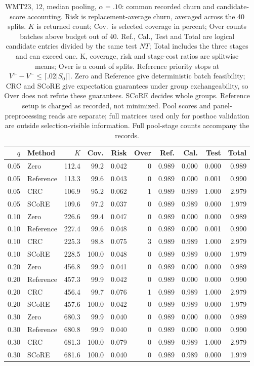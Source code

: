 \begin{table}[t]
\centering\small
\setlength{\tabcolsep}{4pt}
\begin{tabular}{rlrrrrrrrr}
\toprule
$q$ & Method & $K$ & Cov. & Risk & Over & Ref. & Cal. & Test & Total \\
\midrule
0.05 & Zero & 112.4 & 99.2 & 0.042 & 0 & 0.989 & 0.000 & 0.000 & 0.989 \\
0.05 & Reference & 113.3 & 99.6 & 0.043 & 0 & 0.989 & 0.000 & 0.001 & 0.990 \\
0.05 & CRC & 106.9 & 95.2 & 0.062 & 1 & 0.989 & 0.989 & 1.000 & 2.979 \\
0.05 & SCoRE & 109.6 & 97.2 & 0.037 & 0 & 0.989 & 0.989 & 0.000 & 1.979 \\
0.10 & Zero & 226.6 & 99.4 & 0.047 & 0 & 0.989 & 0.000 & 0.000 & 0.989 \\
0.10 & Reference & 227.4 & 99.6 & 0.048 & 0 & 0.989 & 0.000 & 0.001 & 0.990 \\
0.10 & CRC & 225.3 & 98.8 & 0.075 & 3 & 0.989 & 0.989 & 1.000 & 2.979 \\
0.10 & SCoRE & 228.5 & 100.0 & 0.048 & 0 & 0.989 & 0.989 & 0.000 & 1.979 \\
0.20 & Zero & 456.8 & 99.9 & 0.041 & 0 & 0.989 & 0.000 & 0.000 & 0.989 \\
0.20 & Reference & 457.3 & 99.9 & 0.042 & 0 & 0.989 & 0.000 & 0.000 & 0.990 \\
0.20 & CRC & 456.4 & 99.7 & 0.076 & 1 & 0.989 & 0.989 & 1.000 & 2.979 \\
0.20 & SCoRE & 457.6 & 100.0 & 0.042 & 0 & 0.989 & 0.989 & 0.000 & 1.979 \\
0.30 & Zero & 680.3 & 99.9 & 0.040 & 0 & 0.989 & 0.000 & 0.000 & 0.989 \\
0.30 & Reference & 680.8 & 99.9 & 0.040 & 0 & 0.989 & 0.000 & 0.000 & 0.990 \\
0.30 & CRC & 681.3 & 100.0 & 0.079 & 0 & 0.989 & 0.989 & 1.000 & 2.979 \\
0.30 & SCoRE & 681.6 & 100.0 & 0.040 & 0 & 0.989 & 0.989 & 0.000 & 1.979 \\
\bottomrule
\end{tabular}
\caption{WMT23, 12, median pooling, $\alpha=.10$: common recorded churn and candidate-score accounting. Risk is replacement-average churn, averaged across the 40 splits. $K$ is returned count; Cov.\ is selected coverage in percent; Over counts batches above budget out of 40. Ref., Cal., Test and Total are logical candidate entries divided by the same test $NT$; Total includes the three stages and can exceed one. K, coverage, risk and stage-cost ratios are splitwise means; Over is a count of splits. Reference priority stops at $V^+-V^-\le\lceil.02|S_0|\rceil$. Zero and Reference give deterministic batch feasibility; CRC and SCoRE give expectation guarantees under group exchangeability, so Over does not refute these guarantees. SCoRE decides whole groups. Reference setup is charged as recorded, not minimized. Pool scores and panel-preprocessing reads are separate; full matrices used only for posthoc validation are outside selection-visible information. Full pool-stage counts accompany the records.}
\label{tab:common-WMT23-without-synthetic-ref-median}
\end{table}
